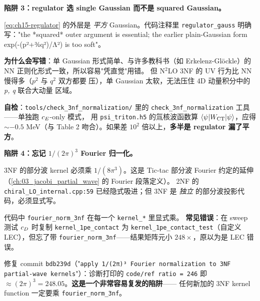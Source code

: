 \begin{pitfallbox}[label={pit:ch15-regulator-form}]
\textbf{陷阱 3：regulator 选 single Gaussian 而不是 squared Gaussian。}

\cref{eq:ch15-regulator} 的外层是 \emph{平方} Gaussian。代码注释里
\texttt{regulator\_gauss} 明确写："the *squared* outer argument is essential;
the earlier plain-Gaussian form exp(-(p²+¾q²)/Λ²) is too soft"。

\textbf{为什么会写错}：单 Gaussian 形式简单、与许多教科书（如
Erkelenz-Glöckle）的 NN 正则化形式一致，所以容易"凭直觉"用错。
但 N\(^2\)LO 3NF 的 UV 行为比 NN 慢得多（\(p^2\) 与 \(q^2\) 双方都要
压），单 Gaussian 太软，无法压住 4D 动量积分中的 \emph{p, q} 联合大动量
区域。

\textbf{自检}：\texttt{tools/check\_3nf\_normalization/} 里的
\texttt{check\_3nf\_normalization} 工具——单独跑 \(c_E\)-only 模式，
用 \texttt{psi\_triton.h5} 的氚核波函数算 \(\langle \psi | W_{\rm CT} | \psi
\rangle\)，应得 \(\sim -0.5\) MeV（与 \cite{Epelbaum2002NLO3NF} Table 2
吻合）。如果差 \(10^2\) 倍以上，\textbf{多半是 regulator 漏了平方}。
\end{pitfallbox}

\begin{pitfallbox}[label={pit:ch15-fourier-norm}]
\textbf{陷阱 4：忘记 \(1/(2\pi)^3\) Fourier 归一化。}

3NF 的部分波 kernel 必须乘 \(1/(8\pi^3)\)。这是 Tic-tac 部分波 Fourier
约定的延伸（\cref{ch:03_jacobi_partial_wave} 的 Fourier 段落定义）。
2NF 的 \texttt{chiral\_LO\_internal.cpp:59} 已经隐式吸进；但 3NF 是
\emph{独立} 的部分波投影代码，必须显式写。

代码中 \texttt{fourier\_norm\_3nf} 在每一个 \texttt{kernel\_*} 里显式乘。
\textbf{常见错误}：在 sweep 测试 \(c_D\) 时复制 \texttt{kernel\_1pe\_contact}
为 \texttt{kernel\_1pe\_contact\_test}（自定义 LEC），但忘了带
\texttt{fourier\_norm\_3nf}——结果矩阵元小 \(248\times\)，原以为是 LEC
错误。

修复 commit \texttt{bdb239d}（"\texttt{apply 1/(2π)³ Fourier normalization
to 3NF partial-wave kernels}"）：诊断打印的 \texttt{code/ref ratio = 246}
即 \(\approx (2\pi)^3 = 248.05\)。\textbf{这是一个非常容易复发的陷阱}——
任何新加的 3NF kernel function 一定要乘 \texttt{fourier\_norm\_3nf}。
\end{pitfallbox}

